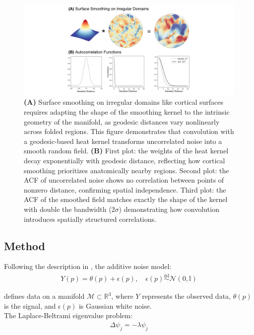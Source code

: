 \documentclass{article}
\begin{document}
\begin{figure}[H]
    \centering
    \includegraphics[width=0.9\linewidth]{project/figures/fig03.png}
    \caption{
    \textbf{(A)} Surface smoothing on irregular domains like cortical surfaces requires adapting the shape of the smoothing kernel to the intrinsic geometry of the manifold, as geodesic distances vary nonlinearly across folded regions. This figure demonstrates that convolution with a geodesic-based heat kernel transforms uncorrelated noise into a smooth random field.
    \textbf{(B)} First plot: the weights of the heat kernel decay exponentially with geodesic distance, reflecting how cortical smoothing prioritizes anatomically nearby regions. Second plot: the ACF of uncorrelated noise shows no correlation between points of nonzero distance, confirming spatial independence. Third plot: the ACF of the smoothed field matches exactly the shape of the kernel with double the bandwidth ($2\sigma$) demonstrating how convolution introduces spatially structured correlations.
    }
    \label{fig:surface-smoothing}
\end{figure}

\subsection{Method}

Following the description in \citet{seo_heat_2010}, the additive noise model:
\begin{align}\label{eq:Y(p)}
    Y(p) = \theta(p) + \epsilon(p), \quad \epsilon(p) \overset{\text{iid}}{\sim} \mathcal{N}(0, \mathbb{I})
\end{align}

\noindent defines data on a manifold $\mathcal{M} \subset \mathbb{R}^3$, where $Y$ represents the observed data, $\theta(p)$ is the signal, and $\epsilon(p)$ is Gaussian white noise. \\

The Laplace-Beltrami eigenvalue problem:
\begin{align}
    \Delta \psi_j = -\lambda \psi_j
\end{align}
\end{document}
